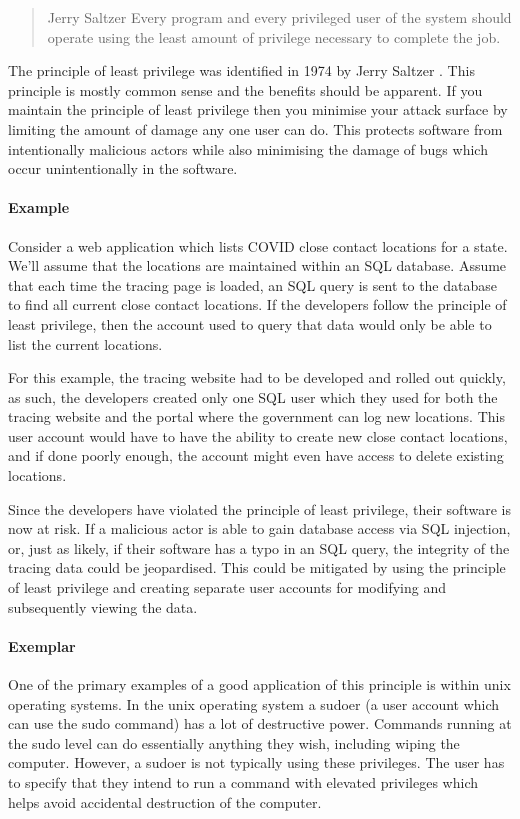 \begin{quote}{Jerry Saltzer \cite{least-privilege}}
Every program and every privileged user of the system should operate using the least amount of privilege necessary to complete the job.
\end{quote}

\noindent The principle of least privilege was identified in 1974 by Jerry Saltzer \cite{least-privilege}.
This principle is mostly common sense and the benefits should be apparent.
If you maintain the principle of least privilege then you minimise your attack surface by limiting the amount of damage any one user can do.
This protects software from intentionally malicious actors while also minimising the damage of bugs which occur unintentionally in the software.

\paragraph{Example}
Consider a web application which lists COVID close contact locations for a state.
We'll assume that the locations are maintained within an SQL database.
Assume that each time the tracing page is loaded, an SQL query is sent to the database to find all current close contact locations.
If the developers follow the principle of least privilege, then the account used to query that data would only be able to list the current locations.

For this example, the tracing website had to be developed and rolled out quickly, as such,
the developers created only one SQL user which they used for both the tracing website and the portal where the government can log new locations.
This user account would have to have the ability to create new close contact locations, and if done poorly enough,
the account might even have access to delete existing locations.

Since the developers have violated the principle of least privilege,
their software is now at risk.
If a malicious actor is able to gain database access via SQL injection, or,
just as likely, if their software has a typo in an SQL query, the integrity of the tracing data could be jeopardised.
This could be mitigated by using the principle of least privilege and creating separate user accounts for modifying and subsequently viewing the data.

\paragraph{Exemplar}
One of the primary examples of a good application of this principle is within unix operating systems.
In the unix operating system a sudoer (a user account which can use the sudo command) has a lot of destructive power.
Commands running at the sudo level can do essentially anything they wish, including wiping the computer.
However, a sudoer is not typically using these privileges.
The user has to specify that they intend to run a command with elevated privileges
which helps avoid accidental destruction of the computer.

